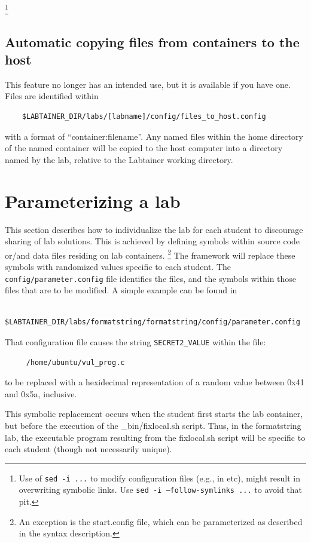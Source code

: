 \documentclass[12pt]{article}
\begin{document}
\footnote{Use of {\tt sed -i ...} to modify configuration files (e.g., in etc), might result in overwriting symbolic links.
Use {\tt sed -i --follow-symlinks ...} to avoid that pit.}

\subsection{Automatic copying files from containers to the host}
This feature no longer has an intended use, but it is available if you have one.
Files are identified within
\begin{verbatim}
    $LABTAINER_DIR/labs/[labname]/config/files_to_host.config
\end{verbatim}
\noindent with a format of ``container:filename''.  Any named files within the home directory of
the named container will be copied to the host computer into a directory named by the lab, relative
to the Labtainer working directory.

\section{Parameterizing a lab}
\label{parameterize}
This section describes how to individualize the lab for each student to discourage
sharing of lab solutions.  This is achieved by defining symbols within source 
code or/and data files residing on lab containers. \footnote{An exception is the
start.config file, which can be parameterized as described in the syntax description.}  
The framework will replace these symbols with randomized values
specific to each student.  The {\tt config/parameter.config} file identifies the files, and
the symbols within those files that are to be modified.  A simple example can be found in 
\begin{verbatim}
    $LABTAINER_DIR/labs/formatstring/formatstring/config/parameter.config
\end{verbatim}

That configuration file causes the string {\tt SECRET2\_VALUE} within the file:
\begin{verbatim}
     /home/ubuntu/vul_prog.c
\end{verbatim}
to be replaced with a hexidecimal representation of a random value
between 0x41 and 0x5a, inclusive.

This symbolic replacement occurs when the student first starts the lab container,
but before the execution of the \_bin/fixlocal.sh script.  Thus, in the formatstring
lab, the executable program resulting from the fixlocal.sh script will be specific
to each student (though not necessarily unique).
\end{document}
